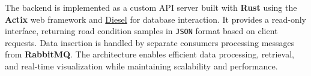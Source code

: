 \noindent The backend is implemented as a custom API server built with \textbf{Rust} using the \textbf{Actix} web framework and \href{https://diesel.rs/}{Diesel} for database interaction. It provides a read-only interface, returning road condition samples in \texttt{JSON} format based on client requests. Data insertion is handled by separate consumers processing messages from \textbf{RabbitMQ}. The architecture enables efficient data processing, retrieval, and real-time visualization while maintaining scalability and performance.
